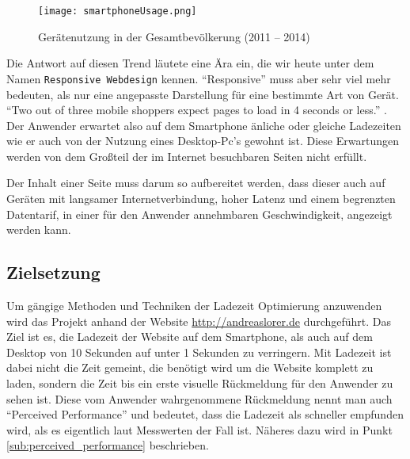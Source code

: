 	\begin{figure}[htbp]
		\begin{center}
			\texttt{[image: smartphoneUsage.png]}
		\end{center}
		\caption{Gerätenutzung in der Gesamtbevölkerung (2011 – 2014)\autocite{tns14}}
		\label{fig:geraetenutzung}
	\end{figure}

	Die Antwort auf diesen Trend läutete eine Ära ein, die wir heute unter dem Namen \texttt{Responsive Webdesign} kennen. "`Responsive"' muss aber sehr viel mehr bedeuten, als nur eine angepasste Darstellung für eine bestimmte Art von Gerät. "`Two out of three mobile shoppers expect pages to load in 4 seconds or less."' \autocite{radware13}. Der Anwender erwartet also auf dem Smartphone änliche oder gleiche Ladezeiten wie er auch von der Nutzung eines Desktop-Pc's gewohnt ist. Diese Erwartungen werden von dem Großteil der im Internet besuchbaren Seiten nicht erfüllt. 


	Der Inhalt einer Seite muss darum so aufbereitet werden, dass dieser auch auf Geräten mit langsamer Internetverbindung, hoher Latenz und einem begrenzten Datentarif, in einer für den Anwender annehmbaren Geschwindigkeit, angezeigt werden kann.\\



\subsection{Zielsetzung} %
\label{sub:zielsetzung}
	Um gängige Methoden und Techniken der Ladezeit Optimierung anzuwenden wird das Projekt anhand der Website \url{http://andreaslorer.de} durchgeführt. Das Ziel ist es, die Ladezeit der Website auf dem Smartphone, als auch auf dem Desktop von 10 Sekunden auf unter 1 Sekunden zu verringern. Mit Ladezeit ist dabei nicht die Zeit gemeint, die benötigt wird um die Website komplett zu laden, sondern die Zeit bis ein erste visuelle Rückmeldung für den Anwender zu sehen ist. Diese vom Anwender wahrgenommene Rückmeldung nennt man auch "`Perceived Performance"' und bedeutet, dass die Ladezeit als schneller empfunden wird, als es eigentlich laut Messwerten der Fall ist. Näheres dazu wird in Punkt \ref{sub:perceived_performance} beschrieben.\\

